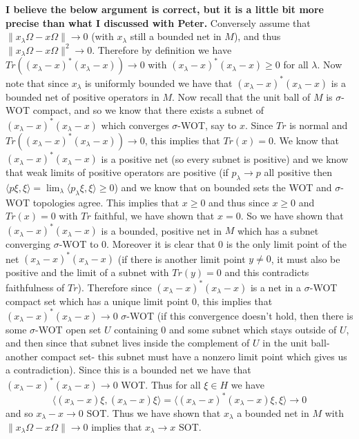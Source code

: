 \documentclass[a4paper,10pt]{report}
\begin{document}
\begin{enumerate}
\begin{enumerate}
			\newline \textbf{I believe the below argument is correct, but it is a little bit more precise than what I discussed with Peter.}  Conversely assume that $\|x_\lambda\Omega - x\Omega \|\rightarrow 0$ (with $x_\lambda$ still a bounded net in $M$), and thus $\|x_\lambda\Omega - x\Omega \|^2 \rightarrow 0$.  Therefore by definition we have $Tr((x_\lambda - x)^*(x_\lambda - x)) \rightarrow 0$ with $(x_\lambda - x)^*(x_\lambda - x) \geq 0$ for all $\lambda$.  Now note that since $x_\lambda$ is uniformly bounded we have that $(x_\lambda - x)^*(x_\lambda - x)$ is a bounded net of positive operators in $M$.  Now recall that the unit ball of $M$ is $\sigma$-WOT compact, and so we know that there exists a subnet of $(x_\lambda - x)^*(x_\lambda - x)$ which converges $\sigma$-WOT, say to $x$.  Since $Tr$ is normal and $Tr((x_\lambda - x)^*(x_\lambda - x)) \rightarrow 0$, this implies that $Tr(x) = 0$.  We know that $(x_\lambda - x)^*(x_\lambda - x)$ is a positive net (so every subnet is positive) and we know that weak limits of positive operators are positive (if $p_\lambda \rightarrow p$ all positive then $\langle p \xi,\xi \rangle = \lim_\lambda {\langle p_\lambda \xi, \xi \rangle} \geq 0$) and we know that on bounded sets the WOT and $\sigma$-WOT topologies agree.  This implies that $x\geq 0$ and thus since $x\geq 0$ and $Tr(x) = 0$ with $Tr$ faithful, we have shown that $x = 0$.  So we have shown that $(x_\lambda - x)^*(x_\lambda - x)$ is a bounded, positive net in $M$ which has a subnet converging $\sigma$-WOT to 0.  Moreover it is clear that 0 is the only limit point of the net $(x_\lambda - x)^*(x_\lambda - x)$ (if there is another limit point $y\neq 0$, it must also be positive and the limit of a subnet with $Tr(y) = 0$ and this contradicts faithfulness of $Tr$).  Therefore since $(x_\lambda - x)^*(x_\lambda - x)$ is a net in a $\sigma$-WOT compact set which has a unique limit point 0, this implies that $(x_\lambda - x)^*(x_\lambda - x) \rightarrow 0$ $\sigma$-WOT (if this convergence doesn't hold, then there is some $\sigma$-WOT open set $U$ containing 0 and some subnet which stays outside of $U$, and then since that subnet lives inside the complement of $U$ in the unit ball-another compact set- this subnet must have a nonzero limit point which gives us a contradiction).    Since this is a bounded net we have that $(x_\lambda - x)^*(x_\lambda - x) \rightarrow 0$ WOT.  Thus for all $\xi\in H$ we have $$\langle (x_\lambda - x)\xi, (x_\lambda - x)\xi \rangle = \langle (x_\lambda - x)^*(x_\lambda - x)\xi,\xi \rangle \rightarrow 0$$ and so $x_\lambda - x \rightarrow 0$ SOT.  Thus we have shown that $x_\lambda$ a bounded net in $M$ with $\|x_\lambda\Omega - x\Omega \|\rightarrow 0$ implies that $x_\lambda \rightarrow x$ SOT.

\end{enumerate}
\end{enumerate}
\end{document}
